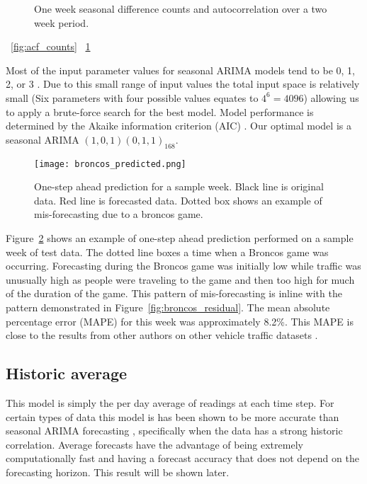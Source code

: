 \begin{figure}[t]
\begin{center}
\end{center}
\caption{One week seasonal difference counts and autocorrelation over a two week period.}
\label{fig:lag_data}
\end{figure}

~\ref{fig:acf_counts}
~\ref{fig:lag_data}

Most of the input parameter values for seasonal ARIMA models tend to be 0, 1, 2, or 3 \cite{Box2008}.  Due to this small range of input values the total input space is relatively small (Six parameters with four possible values equates to $4^6 = 4096$) allowing us to apply a brute-force search for the best model.  Model performance is determined by the Akaike information criterion (AIC) \cite{Akaike1974}.  Our optimal model is a seasonal ARIMA $(1,0,1)(0,1,1)_{168}$.  

\begin{figure}[h]
\begin{center}
\texttt{[image: broncos\_predicted.png]}
\end{center}
\caption{One-step ahead prediction for a sample week.  Black line is original data.  Red line is forecasted data.  Dotted box shows an example of mis-forecasting due to a broncos game.}
\label{fig:arima_prediction}
\end{figure}

Figure~\ref{fig:arima_prediction} shows an example of one-step ahead prediction performed on a sample week of test data.  The dotted line boxes a time when a Broncos game was occurring.  Forecasting during the Broncos game was initially low while traffic was unusually high as people were traveling to the game and then too high for much of the duration of the game.  This pattern of mis-forecasting is inline with the pattern demonstrated in Figure~\ref{fig:broncos_residual}.  The mean absolute percentage error (MAPE) for this week was approximately 8.2\%.  This MAPE is close to the results from other authors on other vehicle traffic datasets \cite{Williams2003,Smith1997}.  



\subsection{Historic average}
This model is simply the per day average of readings at each time step.  For certain types of data this model is has been shown to be more accurate than seasonal ARIMA forecasting \cite{Newsham2010}, specifically when the data has a strong historic correlation.  Average forecasts have the advantage of being extremely computationally fast and having a forecast accuracy that does not depend on the forecasting horizon.  This result will be shown later.

